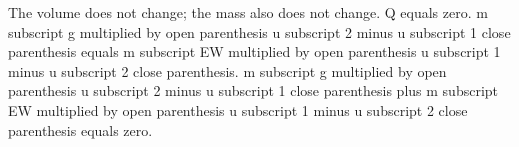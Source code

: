 The volume does not change; the mass also does not change.  
Q equals zero.  
m subscript g multiplied by open parenthesis u subscript 2 minus u subscript 1 close parenthesis equals m subscript EW multiplied by open parenthesis u subscript 1 minus u subscript 2 close parenthesis.  
m subscript g multiplied by open parenthesis u subscript 2 minus u subscript 1 close parenthesis plus m subscript EW multiplied by open parenthesis u subscript 1 minus u subscript 2 close parenthesis equals zero.